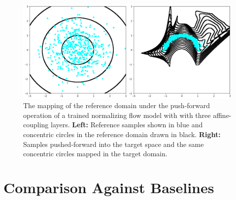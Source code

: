 \begin{figure}[htbp]
    \caption[Mapping of the reference domain under the push-forward operation for a density estimator on 2-d synthetic data]{
        The mapping of the reference domain under the push-forward operation of a trained normalizing flow model with
        with three affine-coupling layers.
        \textbf{Left:} Reference samples shown in blue and concentric circles in the reference domain
        drawn in black.
        \textbf{Right:} Samples pushed-forward into the target space and the same concentric circles
        mapped in the target domain.
    }
    \begin{center}
        \setlength{\fboxsep}{0pt}%
        \setlength{\fboxrule}{1pt}%
        \includegraphics[width=120mm]{figs/nf_circs_cropped}
    \end{center}
    \label{fig:flow_circs}
\end{figure}

\section{Comparison Against Baselines}\label{sec:comparison-against-baselines}

